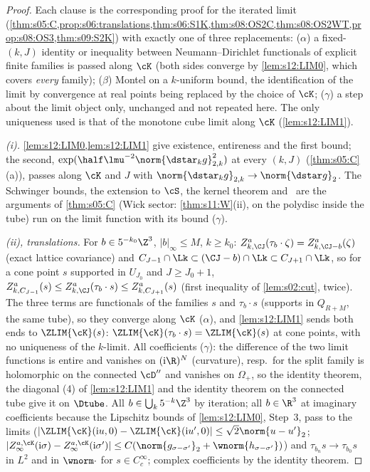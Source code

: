 \begin{proof}
Each clause is the corresponding proof for the iterated limit (\cref{thm:s05:C,prop:s06:translations,thm:s06:S1K,thm:s08:OS2C,thm:s08:OS2WT,prop:s08:OS3,thm:s09:S2K}) with exactly one of three replacements: ($\alpha$) a fixed-$(k,J)$ identity or inequality between Neumann--Dirichlet functionals of explicit finite families is passed along $\cK$ (both sides converge by \cref{lem:s12:LIM0}, which covers \emph{every} family); ($\beta$) Montel on a $k$-uniform bound, the identification of the limit by convergence at real points being replaced by the choice of $\cK$; ($\gamma$) a step about the limit object only, unchanged and not repeated here. The only uniqueness used is that of the monotone cube limit along $\cK$ (\cref{lem:s12:LIM1}).

\emph{(i).} \cref{lem:s12:LIM0,lem:s12:LIM1} give existence, entireness and the first bound; the second, $\exp(\half\lmu^{-2}\norm{\dstar_kg}^2_{2,k})$ at every $(k,J)$ (\cref{thm:s05:C}(a)), passes along $\cK$ and $J$ with $\norm{\dstar_kg}_{2,k}\to\norm{\dstar g}_2$. The Schwinger bounds, the extension to $\cS$, the kernel theorem and \Ezz\ are the arguments of \cref{thm:s05:C} (Wick sector: \cref{thm:s11:W}(ii), on the polydisc inside the tube) run on the limit function with its bound ($\gamma$).

\emph{(ii), translations.} For $b\in5^{-k_0}\Z^3$, $|b|_\infty\le M$, $k\ge k_0$: $Z^a_{k,\CJ}(\tau_b\cdot\zeta)=Z^a_{k,\CJ-b}(\zeta)$ (exact lattice covariance) and $C_{J-1}\cap\Lk\subset(\CJ-b)\cap\Lk\subset C_{J+1}\cap\Lk$, so for a cone point $s$ supported in $U_{J_0}$ and $J\ge J_0+1$, $Z^a_{k,C_{J-1}}(s)\le Z^a_{k,\CJ}(\tau_b\cdot s)\le Z^a_{k,C_{J+1}}(s)$ (first inequality of \cref{lem:s02:cut}, twice). The three terms are functionals of the families $s$ and $\tau_b\cdot s$ (supports in $Q_{R+M}$, the same tube), so they converge along $\cK$ ($\alpha$), and \cref{lem:s12:LIM1} sends both ends to $\ZLIM{\cK}(s)$: $\ZLIM{\cK}(\tau_b\cdot s)=\ZLIM{\cK}(s)$ at cone points, with no uniqueness of the $k$-limit. All coefficients ($\gamma$): the difference of the two limit functions is entire and vanishes on $(\mathrm i\R)^N$ (curvature), resp.\ for the split family is holomorphic on the connected $\cD''$ and vanishes on $\Omega_+$, so the identity theorem, the diagonal (4) of \cref{lem:s12:LIM1} and the identity theorem on the connected tube give it on $\Dtube$. All $b\in\bigcup_k5^{-k}\Z^3$ by iteration; all $b\in\R^3$ at imaginary coefficients because the Lipschitz bounds of \cref{lem:s12:LIM0}, Step~3, pass to the limits ($|\ZLIM{\cK}(\mathrm iu,0)-\ZLIM{\cK}(\mathrm iu',0)|\le\sqrt2\norm{u-u'}_2$; $|Z^{a,\cK}_\infty(\mathrm i\sigma)-Z^{a,\cK}_\infty(\mathrm i\sigma')|\le C(\norm{g_{\sigma-\sigma'}}_2+\wnorm{h_{\sigma-\sigma'}})$) and $\tau_{b_n}s\to\tau_{b_0}s$ in $L^2$ and in $\wnorm\cdot$ for $s\in C^\infty_c$; complex coefficients by the identity theorem.


\end{proof}
